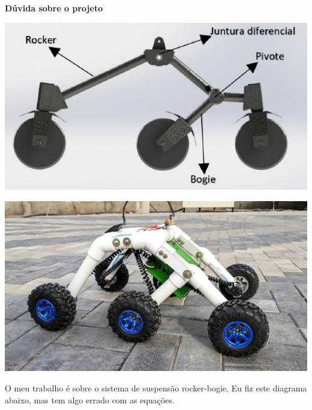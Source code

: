 \documentclass[12pt]{article}
\begin{document}
\fancyfoot[C]{\thepage}
\renewcommand{\headrulewidth}{0.4pt}
\renewcommand{\footrulewidth}{0pt}
\pagestyle{fancy}
\thispagestyle{plain}

\textbf{Dúvida sobre o projeto}

\hspace{10cm}

\begin{minipage}{.45\textwidth}
  \includegraphics[width=\textwidth]{fig/rb-suspension.png}
\end{minipage}%
\begin{minipage}{.45\textwidth}
  \includegraphics[width=\textwidth]{fig/rb.jpg}
\end{minipage}

\hspace{4cm}

O meu trabalho é sobre o sistema de suspensão rocker-bogie. Eu fiz este diagrama abaixo, mas tem algo errado com as equações.

\hspace{4cm}
\end{document}
